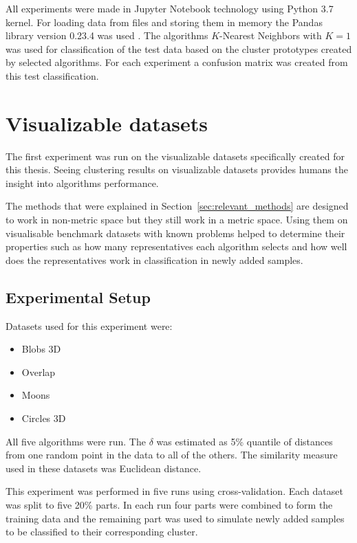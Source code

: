 \documentclass[thesis=B,english]{FITthesis}[2012/10/20]
\begin{document}
All experiments were made in Jupyter Notebook technology using Python 3.7 kernel.
For loading data from files and storing them in memory the Pandas library version 0.23.4 was used \cite{mckinney2010data}.
The algorithms $K$-Nearest Neighbors with $K=1$ was used for classification of the test data based on the cluster prototypes created by selected algorithms.
For each experiment a confusion matrix was created from this test classification.

\section{Visualizable datasets}\label{sec:exp1}

The first experiment was run on the visualizable datasets specifically created for this thesis.
Seeing clustering results on visualizable datasets provides humans the insight into algorithms performance.

The methods that were explained in Section~\ref{sec:relevant_methods} are designed to work in non-metric space but they still work in a metric space.
Using them on visualisable benchmark datasets with known problems helped to determine their properties such as how many representatives each algorithm selects and how well does the representatives work in classification in newly added samples.

\subsection{Experimental Setup}
Datasets used for this experiment were:
\begin{itemize}
    \item Blobs 3D
    \item Overlap
    \item Moons
    \item Circles 3D
\end{itemize}

All five algorithms were run.
The $\delta$ was estimated as 5\% quantile of distances from one random point in the data to all of the others.
The similarity measure used in these datasets was Euclidean distance.

This experiment was performed in five runs using cross-validation.
Each dataset was split to five 20\% parts.
In each run four parts were combined to form the training data and the remaining part was used to simulate newly added samples to be classified to their corresponding cluster.
\end{document}

